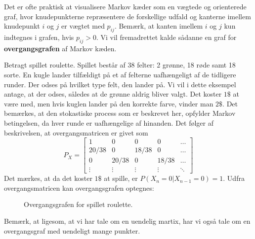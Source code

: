Det er ofte praktisk at visualisere Markov kæder som en vægtede og orienterede graf, hvor knudepunkterne repræsentere de forskellige udfald og kanterne imellem knudepunkt $i$ og $j$ er vægtet med $p_{ij}$. Bemærk, at kanten imellem $i$ og $j$ kun indtegnes i grafen, hvis $p_{ij} > 0$. Vi vil fremadrettet kalde sådanne en graf for \textbf{overgangsgrafen} af Markov kæden.
\begin{example}
  Betragt spillet roulette. Spillet består af 38 felter: 2 grønne, 18 røde samt 18 sorte. En kugle lander tilfældigt på et af felterne uafhængeligt af de tidligere runder. Der odses på hvilket type felt, den lander på. Vi vil i dette eksempel antage, at der odses, således at de grønne aldrig bliver valgt. Det koster $1\$$ at være med, men hvis kuglen lander på den korrekte farve, vinder man $2\$$. Det bemærkes, at den stokastiske process som er beskrevet her, opfylder Markov betingelsen, da hver runde er uafhængelige af hinanden. Det følger af beskrivelsen, at overgangsmatricen er givet som
  \begin{equation} \label{eq:transpositions_graf_roullete}
    P_{X} = \begin{bmatrix}
              1 & 0 & 0 & 0 & \ldots \\
              20 / 38 & 0 & 18 / 38 & 0 & \ldots \\
              0 & 20 / 38 & 0 & 18 / 38 & \ldots \\
              \vdots & \vdots & \vdots & \vdots & \ddots
            \end{bmatrix}
  \end{equation}
  Det mærkes, at da det koster $1 \$$ at spille, er $P(X_n = 0 | X_{n-1} = 0) = 1$. Udfra overgangsmatricen kan overgangsgrafen optegnes:
  \begin{figure}[H]
    \centering
    \caption{Overgangsgrafen for spillet roulette.}
    \label{fig:transpositions_graf_roullete}
  \end{figure}\noindent
  Bemærk, at ligesom, at vi har tale om en uendelig martix, har vi også tale om en overgangsgraf med uendeligt mange punkter.
\end{example}

